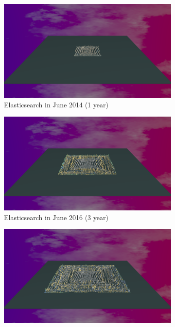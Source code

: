 \begin{figure}[ht]
    \begin{subfigure}{0.48\textwidth}
        \includegraphics[width=\linewidth]{Elasticsearch/Animation001.png}
        \caption{Elasticsearch in June 2014 (1 year)} 
        \label{fig:Elastic_V5_S1}
    \end{subfigure}\hspace*{\fill}
    \begin{subfigure}{0.48\textwidth}
        \includegraphics[width=\linewidth]{Elasticsearch/Animation003.png}
        \caption{Elasticsearch in June 2016 (3 year)} 
        \label{fig:Elastic_V5_S2}
    \end{subfigure}
    \medskip
    \begin{subfigure}{0.48\textwidth}
        \includegraphics[width=\linewidth]{Elasticsearch/Animation005.png}

\end{subfigure}
\end{figure}
